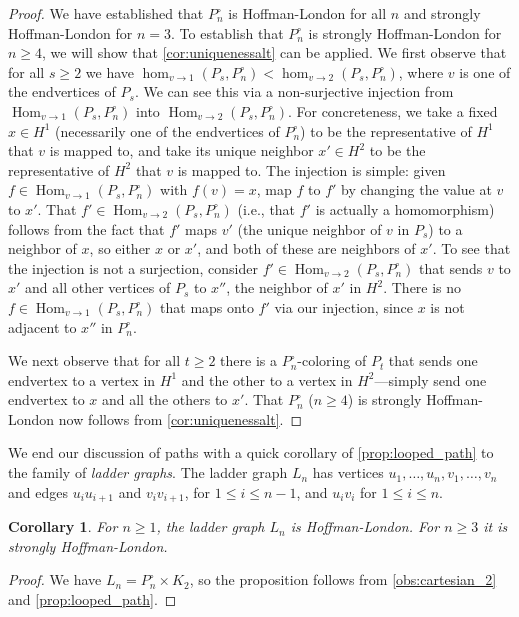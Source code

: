 \documentclass[11pt]{article}
\newtheorem{corollary}[theorem]{Corollary}
\theoremstyle{definition}
\newcommand{\Homclass}[4]{\Hom_{#1\to#2}(#3,#4)}
\newcommand{\homclass}[4]{\hom_{#1\to#2}(#3,#4)}
\renewcommand{\loop}{\circ}
\DeclareMathOperator{\Hom}{Hom}
\begin{document}
\begin{proof}
We have established that $P_n^\loop$ is Hoffman-London for all $n$ and strongly Hoffman-London for $n = 3$. To establish that $P_n^\loop$ is strongly Hoffman-London for $n \ge 4$, we will show that \cref{cor:uniquenessalt} can be applied. We first observe that for all $s \ge 2$ we have $\homclass{v}{1}{P_s}{P_n^\loop} < \homclass{v}{2}{P_s}{P_n^\loop}$, where $v$ is one of the endvertices of $P_s$. We can see this via a non-surjective injection from $\Homclass{v}{1}{P_s}{P_n^\loop}$ into $\Homclass{v}{2}{P_s}{P_n^\loop}$. For concreteness, we take a fixed $x \in H^1$ (necessarily one of the endvertices of $P_n^\loop$) to be the representative of $H^1$ that $v$ is mapped to, and take its unique neighbor $x' \in H^2$ to be the representative of $H^2$ that $v$ is mapped to. The injection is simple: given $f \in \Homclass{v}{1}{P_s}{P_n^\loop}$ with $f(v)=x$, map $f$ to $f'$ by changing the value at $v$ to $x'$. That $f' \in \Homclass{v}{2}{P_s}{P_n^\loop}$ (i.e., that $f'$ is actually a homomorphism) follows from the fact that $f'$ maps $v'$ (the unique neighbor of $v$ in $P_s$) to a neighbor of $x$, so either $x$ or $x'$, and both of these are neighbors of $x'$. To see that the injection is not a surjection, consider $f' \in \Homclass{v}{2}{P_s}{P_n^\loop}$ that sends $v$ to $x'$ and all other vertices of $P_s$ to $x''$, the neighbor of $x'$ in $H^2$. There is no $f \in \Homclass{v}{1}{P_s}{P_n^\loop}$ that maps onto $f'$ via our injection, since $x$ is not adjacent to $x''$ in $P_n^\loop$.

We next observe that for all $t \ge 2$ there is a $P_n^\loop$-coloring of $P_t$ that sends one endvertex to a vertex in $H^1$ and the other to a vertex in $H^2$---simply send one endvertex to $x$ and all the others to $x'$. That $P_n^\loop$ ($n \ge 4$) is strongly Hoffman-London now follows from \cref{cor:uniquenessalt}.
\end{proof}

We end our discussion of paths with a quick corollary of \cref{prop:looped_path} to the family of {\it ladder graphs}. The ladder graph $L_n$ has vertices $u_1, \ldots, u_n, v_1, \ldots, v_n$ and edges $u_iu_{i+1}$ and $v_iv_{i+1}$, for $1 \le i \le n-1$, and $u_iv_i$ for $1 \le i \le n$. 
\begin{corollary}
For $n \ge 1$, the ladder graph $L_n$ is Hoffman-London. For $n \ge 3$ it is strongly Hoffman-London.
\end{corollary}

\begin{proof}
We have $L_n = P_n^\loop \times K_2$, so the proposition follows from \cref{obs:cartesian_2} and \cref{prop:looped_path}. 
\end{proof}
\end{document}
